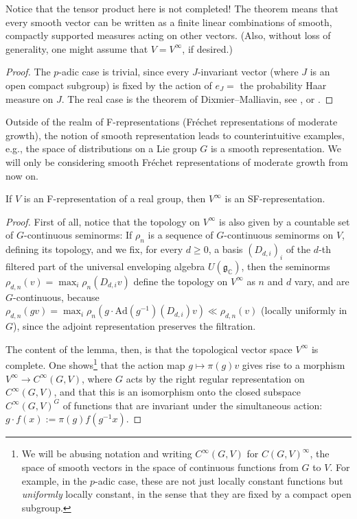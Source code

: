 Notice that the tensor product here is not completed! The theorem means that every smooth vector can be written as a finite linear combinations of smooth, compactly supported measures acting on other vectors. (Also, without loss of generality, one might assume that $V=V^\infty$, if desired.)

\begin{proof}
The $p$-adic case is trivial, since every $J$-invariant vector (where $J$ is an open compact subgroup) is fixed by the action of $e_J=$ the probability Haar measure on $J$. The real case is the theorem of Dixmier--Malliavin, see \cite{Dixmier-Malliavin}, or \cite{Casselman-Dixmier-Malliavin}.
\end{proof}



\begin{remark}
\label{remark-smooth-not-SF}
Outside of the realm of F-representations (Fr\'echet representations of moderate growth), the notion of smooth representation leads to counterintuitive examples, e.g., the space of distributions on a Lie group $G$ is a smooth representation. We will only be considering smooth Fr\'echet representations of moderate growth from now on.
\end{remark}

\begin{lemma}
 \label{lemma-smooth-vectors-Frepresentation}
If $V$ is an F-representation of a real group, then $V^\infty$ is an SF-representation.
\end{lemma}

\begin{proof}
First of all, notice that the topology on $V^\infty$ is also given by a countable set of $G$-continuous seminorms: If $\rho_n$ is a sequence of $G$-continuous seminorms on $V$, defining its topology, and we fix, for every $d\ge 0$, a basis $(D_{d,i})_i$ of the $d$-th filtered part of the universal enveloping algebra $U(\mathfrak g_{\mathbb C})$, then the seminorms $\rho_{d,n}(v) = \max_i \rho_n (D_{d,i}v)$ define the topology on $V^\infty$ as $n$ and $d$ vary, and are $G$-continuous, because $\rho_{d,n}(gv) = \max_i \rho_n (g \cdot \text{Ad}(g^{-1})(D_{d,i}) v) \ll \rho_{d,n}(v)$ (locally uniformly in $G$), since the adjoint representation preserves the filtration. 


The content of the lemma, then, is that the topological vector space $V^\infty$ is complete. One shows\footnote{\label{footnote-smooth}We will be abusing notation and writing $C^\infty(G, V)$ for $C(G, V)^\infty$, the space of smooth vectors in the space of continuous functions from $G$ to $V$. For example, in the $p$-adic case, these are not just locally constant functions but \emph{uniformly} locally constant, in the sense that they are fixed by a compact open subgroup.} that the action map $g\mapsto \pi(g) v$ gives rise to a morphism $V^\infty \to C^\infty(G, V)$, where $G$ acts by the right regular representation on $C^\infty(G, V)$, and that this is an isomorphism onto the closed subspace $C^\infty(G, V)^G$ of functions that are invariant under the simultaneous action: $g\cdot f (x) := \pi(g) f(g^{-1} x)$. 
\end{proof}

